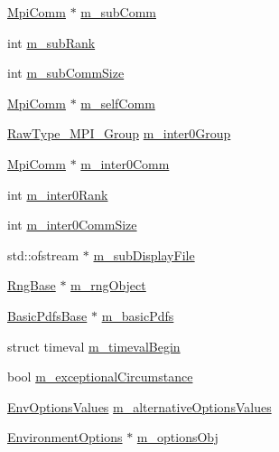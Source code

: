 \begin{DoxyCompactItemize}
\item 
\hyperlink{class_q_u_e_s_o_1_1_mpi_comm}{Mpi\-Comm} $\ast$ \hyperlink{class_q_u_e_s_o_1_1_base_environment_ac8d7b6062d9a58ef1a36eb95753498b4}{m\-\_\-sub\-Comm}
\item 
int \hyperlink{class_q_u_e_s_o_1_1_base_environment_acecae0962d56bae97b6476c7514b428f}{m\-\_\-sub\-Rank}
\item 
int \hyperlink{class_q_u_e_s_o_1_1_base_environment_a4c7b8104e4bb3f1456aa2d85b4dc9a03}{m\-\_\-sub\-Comm\-Size}
\item 
\hyperlink{class_q_u_e_s_o_1_1_mpi_comm}{Mpi\-Comm} $\ast$ \hyperlink{class_q_u_e_s_o_1_1_base_environment_a8f1159427c10aa4dfee51936d46103da}{m\-\_\-self\-Comm}
\item 
\hyperlink{namespace_q_u_e_s_o_acbf5b0ed9be4b77acd471b3914e128c6}{Raw\-Type\-\_\-\-M\-P\-I\-\_\-\-Group} \hyperlink{class_q_u_e_s_o_1_1_base_environment_aed2620ad6e42a86f2a5057a5cdcf99f5}{m\-\_\-inter0\-Group}
\item 
\hyperlink{class_q_u_e_s_o_1_1_mpi_comm}{Mpi\-Comm} $\ast$ \hyperlink{class_q_u_e_s_o_1_1_base_environment_a5107d456b4267a20f3f48222e52f0c7b}{m\-\_\-inter0\-Comm}
\item 
int \hyperlink{class_q_u_e_s_o_1_1_base_environment_a1feb61fba41bc96f4913892df85e6853}{m\-\_\-inter0\-Rank}
\item 
int \hyperlink{class_q_u_e_s_o_1_1_base_environment_ad7a98e45d9c0379a78ee7937f83f3ec1}{m\-\_\-inter0\-Comm\-Size}
\item 
std\-::ofstream $\ast$ \hyperlink{class_q_u_e_s_o_1_1_base_environment_a52b4275aa8ee85994dd304d9fe95c9c5}{m\-\_\-sub\-Display\-File}
\item 
\hyperlink{class_q_u_e_s_o_1_1_rng_base}{Rng\-Base} $\ast$ \hyperlink{class_q_u_e_s_o_1_1_base_environment_a5e80f48ab043b532ee9d4864cd363574}{m\-\_\-rng\-Object}
\item 
\hyperlink{class_q_u_e_s_o_1_1_basic_pdfs_base}{Basic\-Pdfs\-Base} $\ast$ \hyperlink{class_q_u_e_s_o_1_1_base_environment_a43b3045235a87236f0adc7df3427adc0}{m\-\_\-basic\-Pdfs}
\item 
struct timeval \hyperlink{class_q_u_e_s_o_1_1_base_environment_a7b2842a4eb78bcae522cf4f9a5634279}{m\-\_\-timeval\-Begin}
\item 
bool \hyperlink{class_q_u_e_s_o_1_1_base_environment_a2a58407f6c1affeb73ce5fb33c541412}{m\-\_\-exceptional\-Circumstance}
\item 
\hyperlink{class_q_u_e_s_o_1_1_env_options_values}{Env\-Options\-Values} \hyperlink{class_q_u_e_s_o_1_1_base_environment_a38f945c0c2e4d90a550b06a341cc2c7d}{m\-\_\-alternative\-Options\-Values}
\item 
\hyperlink{class_q_u_e_s_o_1_1_environment_options}{Environment\-Options} $\ast$ \hyperlink{class_q_u_e_s_o_1_1_base_environment_aa91c7ac0ab11472bafb0ae4ac36d2194}{m\-\_\-options\-Obj}
\end{DoxyCompactItemize}


